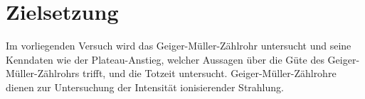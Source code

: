 \section{Zielsetzung}
\label{sec:Zielsetzung}
Im vorliegenden Versuch wird das Geiger-Müller-Zählrohr untersucht und seine Kenndaten wie der Plateau-Anstieg, welcher Aussagen über die Güte des Geiger-Müller-Zählrohrs trifft, und die Totzeit untersucht.
Geiger-Müller-Zählrohre dienen zur Untersuchung der Intensität ionisierender Strahlung.
